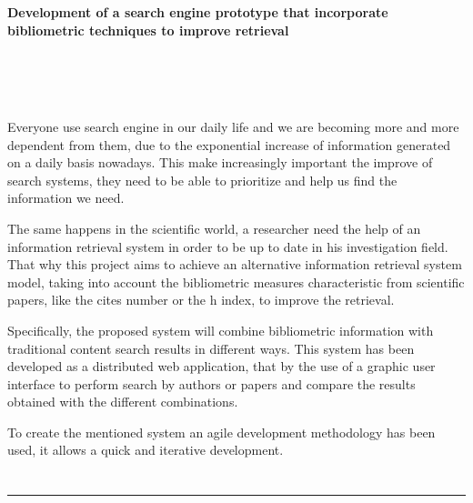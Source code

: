 \cleardoublepage


\thispagestyle{empty}
%
%
\begin{center}
{\large\bfseries Development of a search engine prototype that incorporate bibliometric techniques to improve retrieval}\\
\end{center}
\begin{center}
\myName\\
\end{center}

\\

\vspace{0.7cm}
\\

Everyone use search engine in our daily life and we are becoming more and more dependent from them, due to the exponential increase of information generated on a daily basis nowadays. This make increasingly important the improve of search systems, they need to be able to prioritize and help us find the information we need.

The same happens in the scientific world, a researcher need the help of an information retrieval system in order to be up to date in his investigation field. That why this project aims to achieve an alternative information retrieval system model, taking into account the bibliometric measures characteristic from scientific papers, like the cites number or the h index, to improve the retrieval.

Specifically, the proposed system will combine bibliometric information with traditional content search results in different ways. This system has been developed as a distributed web application, that by the use of a graphic user interface to perform search by authors or papers and compare the results obtained with the different combinations.

To create the mentioned system an agile development methodology has been used, it allows a quick and iterative development.
%
\chapter*{}
\thispagestyle{empty}

\noindent\rule[-1ex]{\textwidth}{2pt}\\[4.5ex]

